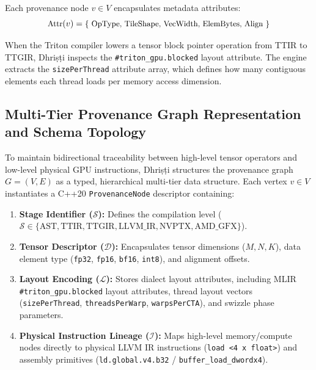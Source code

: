 \documentclass[10pt,journal,compsoc]{IEEEtran}
\begin{document}
Each provenance node $v \in V$ encapsulates metadata attributes:
\begin{equation}
\text{\small Attr}(v) = \text{\small\{ OpType, TileShape, VecWidth, ElemBytes, Align \}}
\end{equation}

When the Triton compiler lowers a tensor block pointer operation from TTIR to TTGIR, Dhri\d{s}\d{t}i inspects the \texttt{\#triton\_gpu.blocked} layout attribute. The engine extracts the \texttt{sizePerThread} attribute array, which defines how many contiguous elements each thread loads per memory access dimension.

\subsection{Multi-Tier Provenance Graph Representation and Schema Topology}
To maintain bidirectional traceability between high-level tensor operators and low-level physical GPU instructions, Dhri\d{s}\d{t}i structures the provenance graph $G = (V, E)$ as a typed, hierarchical multi-tier data structure. Each vertex $v \in V$ instantiates a C++20 \texttt{ProvenanceNode} descriptor containing:
\begin{enumerate}
    \item \textbf{Stage Identifier ($\mathcal{S}$):} Defines the compilation level ($\mathcal{S} \in \{\text{AST}, \text{TTIR}, \text{TTGIR}, \text{LLVM\_IR}, \text{NVPTX}, \text{AMD\_GFX}\}$).
    \item \textbf{Tensor Descriptor ($\mathcal{D}$):} Encapsulates tensor dimensions ($M, N, K$), data element type (\texttt{fp32}, \texttt{fp16}, \texttt{bf16}, \texttt{int8}), and alignment offsets.
    \item \textbf{Layout Encoding ($\mathcal{L}$):} Stores dialect layout attributes, including MLIR \texttt{\#triton\_gpu.blocked} layout attributes, thread layout vectors (\texttt{sizePerThread}, \texttt{threadsPerWarp}, \texttt{warpsPerCTA}), and swizzle phase parameters.
    \item \textbf{Physical Instruction Lineage ($\mathcal{I}$):} Maps high-level memory/compute nodes directly to physical LLVM IR instructions (\texttt{load <4 x float>}) and assembly primitives (\texttt{ld.global.v4.b32} / \texttt{buffer\_load\_dwordx4}).
\end{enumerate}
\end{document}

